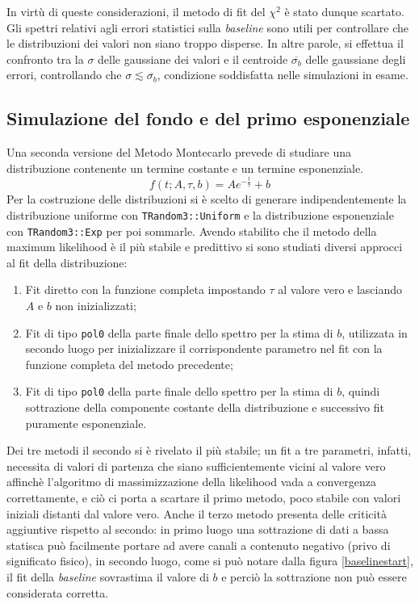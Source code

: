 \documentclass[10pt, oneside, a4paper]{article}   	%
\begin{document}
In virtù di queste considerazioni, il metodo di fit del $\chi^2$ è stato dunque scartato. 
Gli spettri relativi agli errori statistici sulla \textit{baseline} sono utili per controllare che le distribuzioni dei valori non siano troppo disperse. In altre parole, si effettua il confronto tra la $\sigma$ delle gaussiane dei valori e il centroide $\overline{\sigma_{b}}$ delle gaussiane degli errori, controllando che $\sigma\lesssim \overline{\sigma_{b}}$, condizione soddisfatta nelle simulazioni in esame.
%
\subsection{Simulazione del fondo e del primo esponenziale}
Una seconda versione del Metodo Montecarlo prevede di studiare una distribuzione contenente un termine costante e un termine esponenziale. 
\begin{equation}
 f(t;A,\tau,b)=Ae^{-\frac{t}{\tau}}+b
 \label{eq::exp_plus_base}
\end{equation}
Per la costruzione delle distribuzioni si è scelto di generare indipendentemente la distribuzione uniforme con \lstinline{TRandom3::Uniform} e la distribuzione esponenziale con \lstinline{TRandom3::Exp} per poi sommarle. Avendo stabilito che il metodo della maximum likelihood è il più stabile e predittivo si sono studiati diversi approcci al fit della distribuzione:
\begin{enumerate}
  \item Fit diretto con la funzione completa impostando $\tau$ al valore vero e lasciando $A$ e $b$ non inizializzati;
  \item Fit di tipo \lstinline{pol0} della parte finale dello spettro per la stima di $b$, utilizzata in secondo luogo per inizializzare il corrispondente parametro nel fit con la funzione completa del metodo precedente;
  \item Fit di tipo \lstinline{pol0} della parte finale dello spettro per la stima di $b$, quindi sottrazione della componente costante della distribuzione e successivo fit puramente esponenziale.
\end{enumerate}
Dei tre metodi il secondo si è rivelato il più stabile; un fit a tre parametri, infatti, necessita di valori di partenza che siano sufficientemente vicini al valore vero affinchè l'algoritmo di massimizzazione della likelihood vada a convergenza correttamente, e ciò ci porta a scartare il primo metodo, poco stabile con valori iniziali distanti dal valore vero. Anche il terzo metodo presenta delle criticità aggiuntive rispetto al secondo: in primo luogo una sottrazione di dati a bassa statisca può facilmente portare ad avere canali a contenuto negativo (privo di significato fisico), in secondo luogo, come si può notare dalla figura \ref{baselinestart}, il fit della \textit{baseline} sovrastima il valore di $b$ e perciò la sottrazione non può essere considerata corretta.
\end{document}
